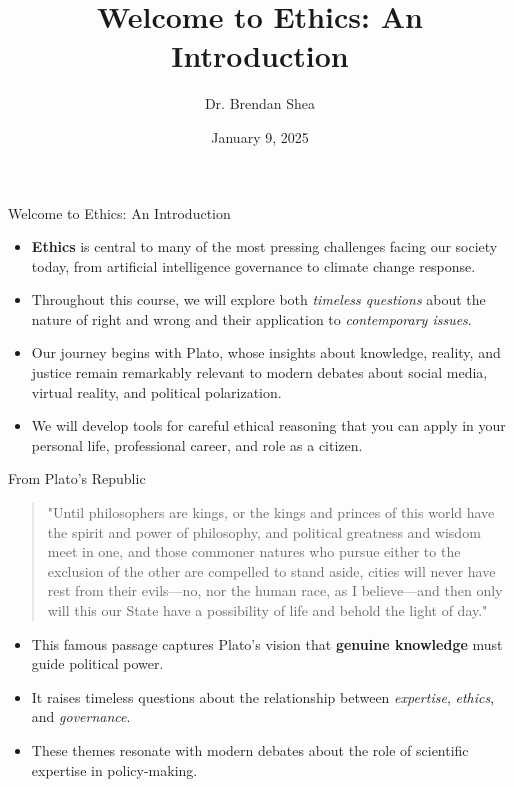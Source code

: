 \documentclass[aspectratio=169]{beamer}
\title{Welcome to Ethics: An Introduction}
\author{Dr. Brendan Shea}
\institute{Philosophy Department}
\date{January 9, 2025}
\begin{document}
\begin{frame}
\titlepage
\end{frame}

\begin{frame}{Welcome to Ethics: An Introduction}
\begin{itemize}
\item \textbf{Ethics} is central to many of the most pressing challenges facing our society today, from artificial intelligence governance to climate change response.
\item Throughout this course, we will explore both \emph{timeless questions} about the nature of right and wrong and their application to \emph{contemporary issues}.
\item Our journey begins with Plato, whose insights about knowledge, reality, and justice remain remarkably relevant to modern debates about social media, virtual reality, and political polarization.
\item We will develop tools for careful ethical reasoning that you can apply in your personal life, professional career, and role as a citizen.
\end{itemize}
\end{frame}

\begin{frame}{From Plato's Republic}
\begin{quote}
\small
"Until philosophers are kings, or the kings and princes of this world have the spirit and power of philosophy, and political greatness and wisdom meet in one, and those commoner natures who pursue either to the exclusion of the other are compelled to stand aside, cities will never have rest from their evils—no, nor the human race, as I believe—and then only will this our State have a possibility of life and behold the light of day."
\end{quote}
\vspace{0.5cm}
\begin{itemize}
\item This famous passage captures Plato's vision that \textbf{genuine knowledge} must guide political power.
\item It raises timeless questions about the relationship between \emph{expertise}, \emph{ethics}, and \emph{governance}.
\item These themes resonate with modern debates about the role of scientific expertise in policy-making.
\end{itemize}
\end{frame}
\end{document}
